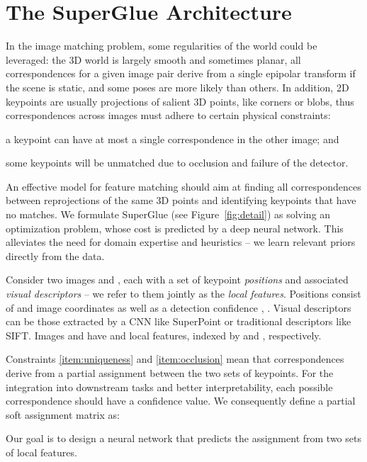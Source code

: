 \documentclass[10pt,twocolumn,letterpaper]{article}
\newcommand{\PAR}[1]{\vskip4pt \noindent{\bf #1~}}
\renewcommand{\*}[1]{\mathbf{#1}}
\newcommand{\0}{\phantom{0}}
\begin{document}
\section{The SuperGlue Architecture}

\PAR{Motivation:}
In the image matching problem, some regularities of the world could be leveraged: the 3D world is largely smooth and sometimes planar, all correspondences for a given image pair derive from a single epipolar transform if the scene is static, and some poses are more likely than others. In addition, 2D keypoints are usually projections of salient 3D points, like corners or blobs, thus correspondences across images must adhere to certain physical constraints: \begin{enumerate*}[label=\textcolor{red}{\roman*)}]
\item\label{item:uniqueness} a keypoint can have at most a single correspondence in the other image; and
\item\label{item:occlusion} some keypoints will be unmatched due to occlusion and failure of the detector.
\end{enumerate*}
An effective model for feature matching should aim at finding all correspondences between reprojections of the same 3D points and identifying keypoints that have no matches. We formulate SuperGlue (see Figure~\ref{fig:detail}) as solving an optimization problem, whose cost is predicted by a deep neural network. This alleviates the need for domain expertise and heuristics -- we learn relevant priors directly from the data.

\PAR{Formulation:} Consider two images  and , each with a set of keypoint \emph{positions}  and associated \emph{visual descriptors}  -- we refer to them jointly  as the \emph{local features}.
Positions consist of  and  image coordinates as well as a detection confidence , . Visual descriptors  can be those extracted by a CNN like SuperPoint or traditional descriptors like SIFT.
Images  and  have  and  local features, indexed by  and , respectively.

\PAR{Partial Assignment:}
Constraints \ref{item:uniqueness} and \ref{item:occlusion} mean that correspondences derive from a partial assignment between the two sets of keypoints. For the integration into downstream tasks and better interpretability, each possible correspondence should have a confidence value.
We consequently define a partial soft assignment matrix  as:
    
Our goal is to design a neural network that predicts the assignment  from two sets of local features.
\end{document}
